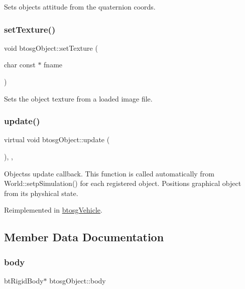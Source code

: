 Sets objects attitude from the quaternion coords. \mbox{\label{classbtosgObject_aff54acbc7c66811efb0cf2838107a241}} 
\subsubsection{\texorpdfstring{set\+Texture()}{setTexture()}}
{\footnotesize\ttfamily void btosg\+Object\+::set\+Texture (\begin{DoxyParamCaption}\item[{char const $\ast$}]{fname }\end{DoxyParamCaption})\hspace{0.3cm}{\ttfamily [inherited]}}

Sets the object texture from a loaded image file. \mbox{\label{classbtosgObject_a342917817dfde62554f83da8e0d5110b}} 
\subsubsection{\texorpdfstring{update()}{update()}}
{\footnotesize\ttfamily virtual void btosg\+Object\+::update (\begin{DoxyParamCaption}{ }\end{DoxyParamCaption})\hspace{0.3cm}{\ttfamily [inline]}, {\ttfamily [virtual]}, {\ttfamily [inherited]}}

Objects\textquotesingle{}s update callback. This function is called automatically from World\+::setp\+Simulation() for each registered object. Positions graphical object from its physhical state. 

Reimplemented in \hyperlink{classbtosgVehicle_a5fd0f471df492ac232c9b772a28bd2b9}{btosg\+Vehicle}.



\subsection{Member Data Documentation}
\mbox{\label{classbtosgObject_a64ccde0543c184ed1749fdb9c9699785}} 
\subsubsection{\texorpdfstring{body}{body}}
{\footnotesize\ttfamily bt\+Rigid\+Body$\ast$ btosg\+Object\+::body\hspace{0.3cm}{\ttfamily [inherited]}}



